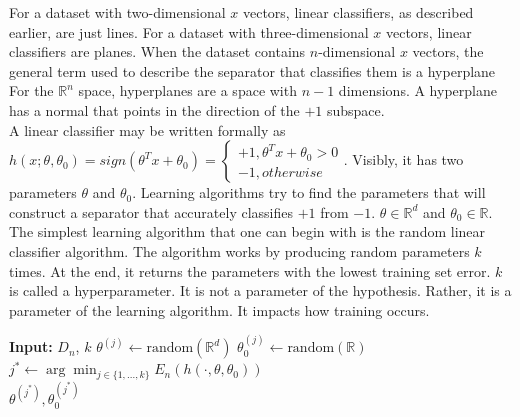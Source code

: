 \documentclass{article}
\begin{document}
	For a dataset with two-dimensional $x$ vectors, linear classifiers, as described earlier, are just lines. For a dataset with three-dimensional $x$ vectors, linear classifiers are planes. When the dataset contains $n$-dimensional $x$ vectors, the general term used to describe the separator that classifies them is a hyperplane For the $\mathbb{R}^n$ space, hyperplanes are a space with $n-1$ dimensions. A hyperplane has a normal that points in the direction of the $+1$ subspace. \\
	
	A linear classifier may be written formally as $h(x; \theta, \theta_0)=sign(\theta^T{x}+\theta_0)=\begin{cases}
        +1, \theta^Tx+\theta_0>0\\
        -1, otherwise
    \end{cases}$. Visibly, it has two parameters $\theta$ and $\theta_0$. Learning algorithms try to find the parameters that will construct a separator that accurately classifies $+1$ from $-1$. $\theta \in \mathbb{R}^d$ and $\theta_0\in\mathbb{R}$.  \\

    The simplest learning algorithm that one can begin with is the random linear classifier algorithm. The algorithm works by producing random parameters $k$ times. At the end, it returns the parameters with the lowest training set error. $k$ is called a hyperparameter. It is not a parameter of the hypothesis. Rather, it is a parameter of the learning algorithm. It impacts how training occurs. \\

    \begin{algorithm}
    \begin{algorithmic}[]
        \State \textbf{Input:} $D_n$, $k$
            \State $\theta^{(j)} \gets \text{random}(\mathbb{R}^d)$
            \State $\theta^{(j)}_0 \gets \text{random}(\mathbb{R})$
        \EndFor
        \State $j^* \gets \arg\min_{j \in \{1, ..., k\}} {E_n(h(\cdot,\theta,\theta_0))}$ \\
        \Return $\theta^{(j^*)}, \theta_0^{(j^*)}$
    \end{algorithmic}
    \end{algorithm}
    



    
	
\end{document}
